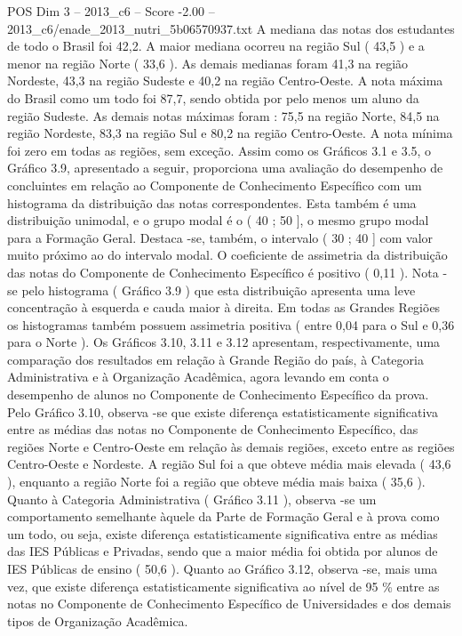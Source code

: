 \begin{textsample}{POS Dim 3 – 2013\_c6 – Score -2.00 – 2013\_c6/enade\_2013\_nutri\_5b06570937.txt}
A mediana das notas dos estudantes de todo o Brasil foi 42,2.
A maior mediana ocorreu na região Sul ( 43,5 ) e a menor na região Norte ( 33,6 ).
As demais medianas foram 41,3 na região Nordeste, 43,3 na região Sudeste e 40,2 na região Centro-Oeste.
A nota máxima do Brasil como um todo foi 87,7, sendo obtida por pelo menos um aluno da região Sudeste.
As demais notas máximas foram : 75,5 na região Norte, 84,5 na região Nordeste, 83,3 na região Sul e 80,2 na região Centro-Oeste.
A nota mínima foi zero em todas as regiões, sem exceção.
Assim como os Gráficos 3.1 e 3.5, o Gráfico 3.9, apresentado a seguir, proporciona uma avaliação do desempenho de concluintes em relação ao Componente de Conhecimento Específico com um histograma da distribuição das notas correspondentes.
Esta também é uma distribuição unimodal, e o grupo modal é o ( 40 ; 50 ], o mesmo grupo modal para a Formação Geral.
Destaca -se, também, o intervalo ( 30 ; 40 ] com valor muito próximo ao do intervalo modal.
O coeficiente de assimetria da distribuição das notas do Componente de Conhecimento Específico é positivo ( 0,11 ).
Nota -se pelo histograma ( Gráfico 3.9 ) que esta distribuição apresenta uma leve concentração à esquerda e cauda maior à direita.
Em todas as Grandes Regiões os histogramas também possuem assimetria positiva ( entre 0,04 para o Sul e 0,36 para o Norte ).
Os Gráficos 3.10, 3.11 e 3.12 apresentam, respectivamente, uma comparação dos resultados em relação à Grande Região do país, à Categoria Administrativa e à Organização Acadêmica, agora levando em conta o desempenho de alunos no Componente de Conhecimento Específico da prova.
Pelo Gráfico 3.10, observa -se que existe diferença estatisticamente significativa entre as médias das notas no Componente de Conhecimento Específico, das regiões Norte e Centro-Oeste em relação às demais regiões, exceto entre as regiões Centro-Oeste e Nordeste.
A região Sul foi a que obteve média mais elevada ( 43,6 ), enquanto a região Norte foi a região que obteve média mais baixa ( 35,6 ).
Quanto à Categoria Administrativa ( Gráfico 3.11 ), observa -se um comportamento semelhante àquele da Parte de Formação Geral e à prova como um todo, ou seja, existe diferença estatisticamente significativa entre as médias das IES Públicas e Privadas, sendo que a maior média foi obtida por alunos de IES Públicas de ensino ( 50,6 ).
Quanto ao Gráfico 3.12, observa -se, mais uma vez, que existe diferença estatisticamente significativa ao nível de 95 \% entre as notas no Componente de Conhecimento Específico de Universidades e dos demais tipos de Organização Acadêmica.

\end{textsample}
